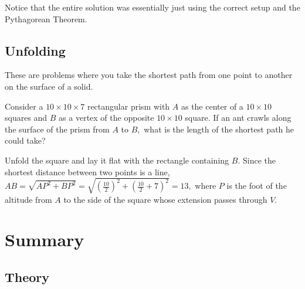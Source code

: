 Notice that the entire solution was essentially just using the correct setup and the Pythagorean Theorem.

\subsection{Unfolding}
These are problems where you take the shortest path from one point to another on the surface of a solid.

\begin{exam}
Consider a $10\times 10\times 7$ rectangular prism with $A$ as the center of a $10\times 10$ squares and $B$ as a vertex of the opposite $10\times 10$ square. If an ant crawls along the surface of the prism from $A$ to $B,$ what is the length of the shortest path he could take?
\end{exam}

\begin{sol}
Unfold the square and lay it flat with the rectangle containing $B.$ Since the shortest distance between two points is a line, $AB=\sqrt{AP^2+BP^2}=\sqrt{(\frac{10}{2})^2+(\frac{10}{2}+7)^2}=13,$ where $P$ is the foot of the altitude from $A$ to the side of the square whose extension passes through $V.$
\begin{center}
\end{center}
\end{sol}

\section{Summary}

\subsection{Theory}

